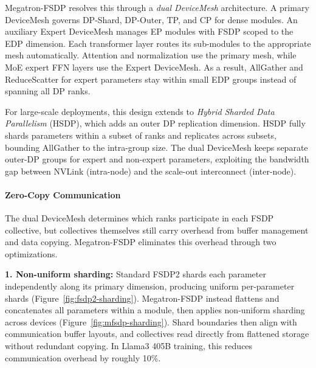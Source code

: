 Megatron-FSDP resolves this through a \emph{dual DeviceMesh} architecture. A primary DeviceMesh governs DP-Shard, DP-Outer, TP, and CP for dense modules. An auxiliary Expert DeviceMesh manages EP modules with FSDP scoped to the EDP dimension. Each transformer layer routes its sub-modules to the appropriate mesh automatically. Attention and normalization use the primary mesh, while MoE expert FFN layers use the Expert DeviceMesh. As a result, AllGather and ReduceScatter for expert parameters stay within small EDP groups instead of spanning all DP ranks.


For large-scale deployments, this design extends to \emph{Hybrid Sharded Data Parallelism} (HSDP), which adds an outer DP replication dimension. HSDP fully shards parameters within a subset of ranks and replicates across subsets, bounding AllGather to the intra-group size. The dual DeviceMesh keeps separate outer-DP groups for expert and non-expert parameters, exploiting the bandwidth gap between NVLink (intra-node) and the scale-out interconnect (inter-node).

\paragraph{Zero-Copy Communication}

The dual DeviceMesh determines which ranks participate in each FSDP collective, but collectives themselves still carry overhead from buffer management and data copying. Megatron-FSDP eliminates this overhead through two optimizations.

\textbf{1. Non-uniform sharding:} Standard FSDP2 shards each parameter independently along its primary dimension, producing uniform per-parameter shards (Figure~\ref{fig:fsdp2-sharding}). Megatron-FSDP instead flattens and concatenates all parameters within a module, then applies non-uniform sharding across devices (Figure~\ref{fig:mfsdp-sharding}). Shard boundaries then align with communication buffer layouts, and collectives read directly from flattened storage without redundant copying. In Llama3 405B training, this reduces communication overhead by roughly 10\%.

